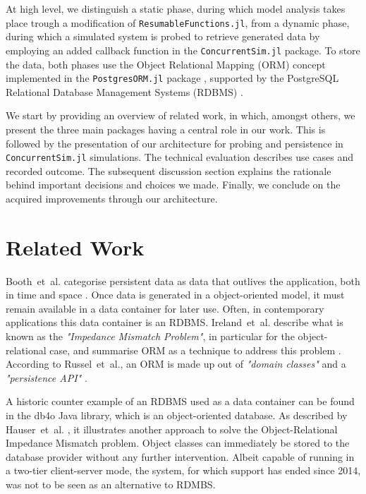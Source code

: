 \documentclass{juliacon}
\begin{document}
At high level, we distinguish a static phase, during which model analysis takes place trough a modification of \texttt{ResumableFunctions.jl}, from a dynamic phase, during which a simulated system is probed to retrieve generated data by employing an added callback function in the \texttt{ConcurrentSim.jl}  package. To store the data, both phases use the Object Relational Mapping (ORM) concept \cite{russell2008bridging} implemented in the \texttt{PostgresORM.jl} package \cite{tecnivelPostgresORM}, supported by the PostgreSQL Relational Database Management Systems (RDBMS) \cite{psqldocs}. \vskip 6pt

We start by providing an overview of related work, in which, amongst others, we present the three main packages having a central role in our work. This is followed by the presentation of our architecture for probing and persistence in \texttt{ConcurrentSim.jl} simulations. The technical evaluation describes use cases and recorded outcome. The subsequent discussion section explains the rationale behind important decisions and choices we made. Finally, we conclude on the acquired improvements through our architecture. \vskip 6pt

\section{Related Work}\label{MainPackages}

Booth~et~al. categorise persistent data as data that outlives the application, both in time and space \cite{booch2008object}. Once data is generated in a object-oriented model, it must remain available in a data container for later use. Often, in contemporary applications this data container is an RDBMS. Ireland~et~al. describe what is known as the \textit{"Impedance Mismatch Problem"}, in particular for the object-relational case, and summarise ORM as a technique to address this problem \cite{ireland2009classification}. According to Russel~et~al., an ORM is made up out of \textit{"domain classes"} and a \textit{"persistence API"} \cite{russell2008bridging}.\vskip 6pt

A historic counter example of an RDBMS used as a data container can be found in the db4o Java library, which is an object-oriented database. As described by Hauser~et~al. \cite{hauser2011review}, it illustrates another approach to solve the Object-Relational Impedance Mismatch problem. Object classes can immediately be stored to the database provider without any further intervention. Albeit capable of running in a two-tier client-server mode, the system, for which support has ended since 2014, was not to be seen as an alternative to RDMBS.\vskip 6pt
\end{document}
